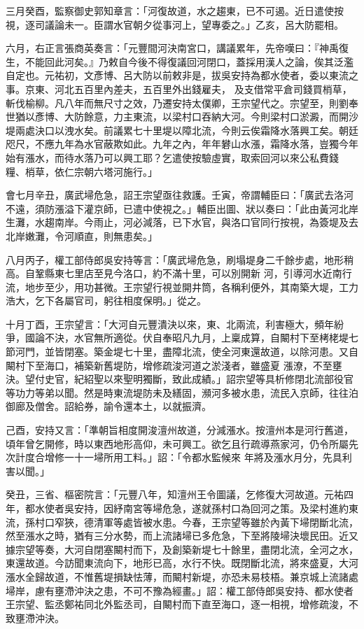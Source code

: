 \begin{pinyinscope}
 三月癸酉，監察御史郭知章言：「河復故道，水之趨東，已不可遏。近日遣使按視，逐司議論未一。臣謂水官朝夕從事河上，望專委之。」乙亥，呂大防罷相。



 六月，右正言張商英奏言：「元豐間河決南宮口，講議累年，先帝嘆曰：『神禹復生，不能回此河矣。』乃敕自今後不得復議回河閉口，蓋採用漢人之論，俟其泛濫自定也。元祐初，文彥博、呂大防以前敕非是，拔吳安持為都水使者，委以東流之事。京東、河北五百里內差夫，五百里外出錢雇夫，
 及支借常平倉司錢買梢草，斬伐榆柳。凡八年而無尺寸之效，乃遷安持太僕卿，王宗望代之。宗望至，則劉奉世猶以彥博、大防餘意，力主東流，以梁村口吞納大河。今則梁村口淤澱，而開沙堤兩處決口以洩水矣。前議累七十里堤以障北流，今則云俟霜降水落興工矣。朝廷咫尺，不應九年為水官蔽欺如此。九年之內，年年礬山水漲，霜降水落，豈獨今年始有漲水，而待水落乃可以興工耶？乞遣使按驗虛實，取索回河以來公私費錢
 糧、梢草，依仁宗朝六塔河施行。」



 會七月辛丑，廣武埽危急，詔王宗望亟往救護。壬寅，帝謂輔臣曰：「廣武去洛河不遠，須防漲溢下灌京師，已遣中使視之。」輔臣出圖、狀以奏曰：「此由黃河北岸生灘，水趨南岸。今雨止，河必減落，已下水官，與洛口官同行按視，為簽堤及去北岸嫩灘，令河順直，則無患矣。」



 八月丙子，權工部侍郎吳安持等言：「廣武埽危急，刷塌堤身二千餘步處，地形稍高。自鞏縣東七里店至見今洛口，約不滿十里，可以別開新
 河，引導河水近南行流，地步至少，用功甚微。王宗望行視並開井筒，各稱利便外，其南築大堤，工力浩大，乞下各屬官司，躬往相度保明。」從之。



 十月丁酉，王宗望言：「大河自元豐潰決以來，東、北兩流，利害極大，頻年紛爭，國論不決，水官無所適從。伏自奉昭凡九月，上稟成算，自闞村下至栲栳堤七節河門，並皆閉塞。築金堤七十里，盡障北流，使全河東還故道，以除河患。又自闞村下至海口，補築新舊堤防，增修疏浚河道之淤淺者，雖盛夏
 漲潦，不至壅決。望付史官，紀紹聖以來聖明獨斷，致此成績。」詔宗望等具析修閉北流部役官等功力等弟以聞。然是時東流堤防未及繕固，瀕河多被水患，流民入京師，往往泊御廊及僧舍。詔給券，諭令還本土，以就振濟。



 己酉，安持又言：「準朝旨相度開浚澶州故道，分減漲水。按澶州本是河行舊道，頃年曾乞開修，時以東西地形高仰，未可興工。欲乞且行疏導燕家河，仍令所屬先次計度合增修一十一埽所用工料。」詔：「令都水監候來
 年將及漲水月分，先具利害以聞。」



 癸丑，三省、樞密院言：「元豐八年，知澶州王令圖議，乞修復大河故道。元祐四年，都水使者吳安持，因紓南宮等埽危急，遂就孫村口為回河之策。及梁村進約東流，孫村口窄狹，德清軍等處皆被水患。今春，王宗望等雖於內黃下埽閉斷北流，然至漲水之時，猶有三分水勢，而上流諸埽已多危急，下至將陵埽決壞民田。近又據宗望等奏，大河自閉塞闞村而下，及創築新堤七十餘里，盡閉北流，全河之水，
 東還故道。今訪聞東流向下，地形已高，水行不快。既閉斷北流，將來盛夏，大河漲水全歸故道，不惟舊堤損缺怯薄，而闞村新堤，亦恐未易枝梧。兼京城上流諸處埽岸，慮有壅滯沖決之患，不可不豫為經畫。」詔：權工部侍郎吳安持、都水使者王宗望、監丞鄭祐同北外監丞司，自闞村而下直至海口，逐一相視，增修疏浚，不致壅滯沖決。




\end{pinyinscope}
